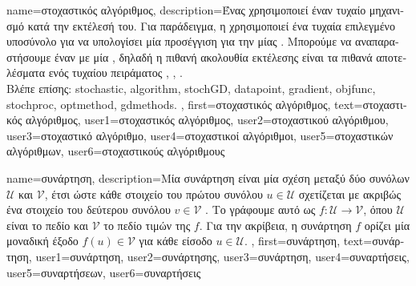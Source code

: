 {name={\foreignlanguage{greek}{στοχαστικός αλγόριθμος}}, 
	description={\foreignlanguage{greek}{Ένας}   
		\foreignlanguage{greek}{χρησιμοποι\-εί έναν τυχαίο μηχανισμό κατά την εκτέλεσή του. Για παράδειγμα, η} 
		 \foreignlanguage{greek}{χρησιμοποιεί ένα τυχαία επιλεγμένο υποσύνολο}   
		\foreignlanguage{greek}{για να υπολογίσει μία προσέγγιση για την}  \foreignlanguage{greek}{μίας} . 
		\foreignlanguage{greek}{Μπορούμε να αναπαραστήσουμε έναν}   \foreignlanguage{greek}{με 
		μία} , \foreignlanguage{greek}{δηλαδή η πιθανή ακολουθία εκτέλεσης είναι τα πιθανά αποτελέσματα 
		ενός τυχαίου πειράματος} \cite{BertsekasProb}, \cite{RandomizedAlgos}, \cite{Gallager13}. \\ 
		\foreignlanguage{greek}{Βλέπε επίσης:} \gls{stochastic}, \gls{algorithm}, \gls{stochGD}, \gls{datapoint}, \gls{gradient}, \gls{objfunc}, \gls{stochproc}, 
		\gls{optmethod}, \gls{gdmethods}. },
	first={\foreignlanguage{greek}{στοχαστικός αλγόριθμος}},
	text={\foreignlanguage{greek}{στοχαστικός αλγόριθμος}},
	user1={\foreignlanguage{greek}{στοχαστικός αλγόριθμος}}, %
	user2={\foreignlanguage{greek}{στοχαστικού αλγόριθμου}}, %
	user3={\foreignlanguage{greek}{στοχαστικό αλγόριθμο}}, %
	user4={\foreignlanguage{greek}{στοχαστικοί αλγόριθμοι}}, %
	user5={\foreignlanguage{greek}{στοχαστικών αλγόριθμων}}, %
	user6={\foreignlanguage{greek}{στοχαστικούς αλγόριθμους}} %
}

{name={\foreignlanguage{greek}{συνάρτηση}},
	description={\foreignlanguage{greek}{Μία συνάρτηση είναι μία σχέση} 
		\foreignlanguage{greek}{μεταξύ δύο συνόλων $\mathcal{U}$ και $\mathcal{V}$, έτσι ώστε κάθε στοιχείο του 
		πρώτου συνόλου $u \in \mathcal{U}$ σχετίζεται με ακριβώς ένα στοιχείο του δεύτερου συνόλου}
		$v \in \mathcal{V}$ \cite{RudinBookPrinciplesMatheAnalysis}. \foreignlanguage{greek}{Το γράφουμε αυτό ως 
		$f: \mathcal{U} \rightarrow \mathcal{V}$, όπου $\mathcal{U}$ είναι το πεδίο και  
		$\mathcal{V}$ το πεδίο τιμών της $f$. Για την ακρίβεια, η συνάρτηση $f$ ορίζει μία μοναδική 
		έξοδο $f(u) \in \mathcal{V}$ για κάθε είσοδο} $u \in \mathcal{U}$. },
	first={\foreignlanguage{greek}{συνάρτηση}},
	text={\foreignlanguage{greek}{συνάρτηση}},
	user1={\foreignlanguage{greek}{συνάρτηση}}, %
  	user2={\foreignlanguage{greek}{συνάρτησης}}, %
	user3={\foreignlanguage{greek}{συνάρτηση}}, %
	user4={\foreignlanguage{greek}{συναρτήσεις}}, %
  	user5={\foreignlanguage{greek}{συναρτήσεων}}, %
	user6={\foreignlanguage{greek}{συναρτήσεις}} %
}

